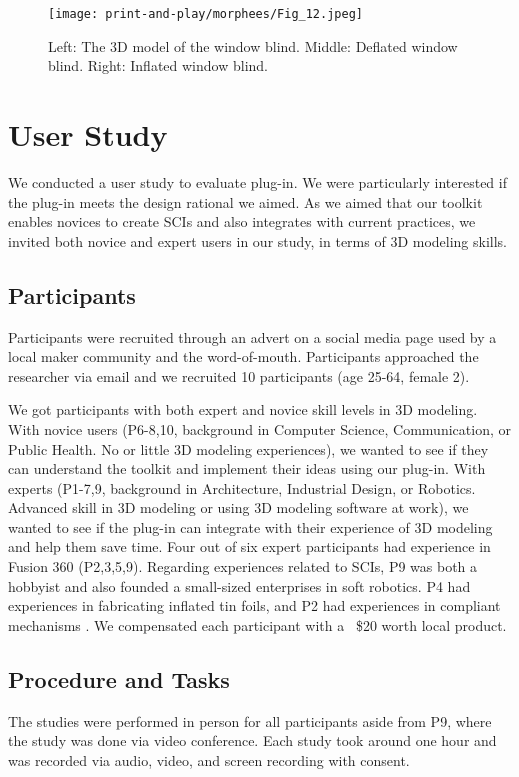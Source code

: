       \begin{figure}[htb]
        \centering
        \texttt{[image: print-and-play/morphees/Fig\_12.jpeg]}
        \caption{Left: The 3D model of the window blind. Middle: Deflated window
          blind. Right: Inflated window blind.}
        \label{fig:appl_windowblind}
      \end{figure}
    
  \section{User Study}
    We conducted a user study to evaluate \mp plug-in. We were particularly
    interested if the plug-in meets the design rational we aimed.  As we aimed
    that our toolkit enables novices to create SCIs and also integrates with
    current practices, we invited both novice and expert users in our study, in
    terms of 3D modeling skills.
      
    \subsection{Participants}
      Participants were recruited through an advert on a social media page used
      by a local maker community and the word-of-mouth. Participants approached
      the researcher via email and we recruited 10 participants (age 25-64,
      female 2). 
        
      We got participants with both expert and novice skill levels in 3D
      modeling.  With novice users (P6-8,10, background in Computer Science,
      Communication, or Public Health. No or little 3D modeling experiences), we
      wanted to see if they can understand the toolkit and implement their ideas
      using our plug-in.  With experts (P1-7,9, background in Architecture,
      Industrial Design, or Robotics. Advanced skill in 3D modeling or using 3D
      modeling software at work), we wanted to see if the plug-in can integrate
      with their experience of 3D modeling and help them save time.  Four out of
      six expert participants had experience in Fusion 360 (P2,3,5,9).
      Regarding experiences related to SCIs, P9 was both a hobbyist and also
      founded a small-sized enterprises in soft robotics.  P4 had experiences in
      fabricating inflated tin foils, and P2 had experiences in compliant
      mechanisms \cite{howell2013compliant}.  We compensated each participant
      with a ~\$20 worth local product.
        
    \subsection{Procedure and Tasks}
      The studies were performed in person for all participants aside from P9,
      where the study was done via video conference. Each study took around one
      hour and was recorded via audio, video, and screen recording with consent.
        
